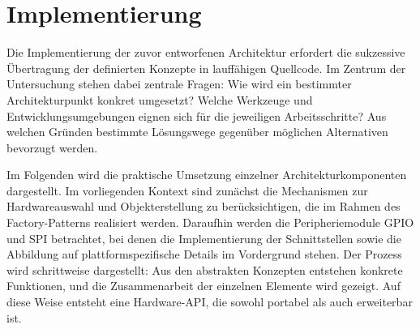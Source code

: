 \section{Implementierung}
Die Implementierung der zuvor entworfenen Architektur erfordert die sukzessive Übertragung der definierten Konzepte in lauffähigen Quellcode. 
Im Zentrum der Untersuchung stehen dabei zentrale Fragen: 
Wie wird ein bestimmter Architekturpunkt konkret umgesetzt?  
Welche Werkzeuge und Entwicklungsumgebungen eignen sich für die jeweiligen Arbeitsschritte? 
Aus welchen Gründen bestimmte Lösungswege gegenüber möglichen Alternativen bevorzugt werden.


Im Folgenden wird die praktische Umsetzung einzelner Architekturkomponenten dargestellt.
 Im vorliegenden Kontext sind zunächst die Mechanismen zur Hardwareauswahl und Objekterstellung zu berücksichtigen, die im Rahmen des Factory-Patterns realisiert werden. 
 Daraufhin werden die Peripheriemodule GPIO und SPI betrachtet, bei denen die Implementierung der Schnittstellen sowie die Abbildung auf plattformspezifische Details im Vordergrund stehen. 
Der Prozess wird schrittweise dargestellt: Aus den abstrakten Konzepten entstehen konkrete Funktionen, und die Zusammenarbeit der einzelnen Elemente wird gezeigt. Auf diese Weise entsteht eine Hardware-API, die sowohl portabel als auch erweiterbar ist.
 
%
%
%
%
%

